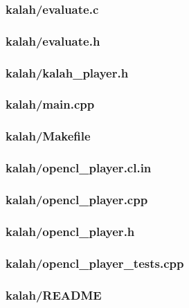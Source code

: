 \documentclass{article}
\begin{document}
\subsubsection*{kalah/evaluate.c}


\subsubsection*{kalah/evaluate.h}


\subsubsection*{kalah/kalah\_player.h}


\subsubsection*{kalah/main.cpp}


\subsubsection*{kalah/Makefile}


\subsubsection*{kalah/opencl\_player.cl.in}


\subsubsection*{kalah/opencl\_player.cpp}


\subsubsection*{kalah/opencl\_player.h}


\subsubsection*{kalah/opencl\_player\_tests.cpp}


\subsubsection*{kalah/README}

\end{document}
